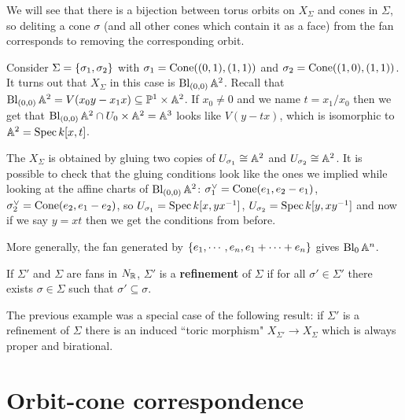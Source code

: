 \begin{remark}
We will see that there is a bijection between torus orbits on $X_\Sigma$ and cones in $\Sigma$, so deliting a cone $\sigma$ (and all other cones which contain it as a face) from the fan corresponds to removing the corresponding orbit.
\end{remark}


\begin{example}
Consider $\Sigma=\left\{{\sigma_1,\sigma_2}\right\}$ with $\sigma_1=\operatorname{Cone}((0,1),(1,1))$ and $\sigma_2=\operatorname{Cone}((1,0),(1,1))$. It turns out that $X_\Sigma$ in this case is $\operatorname{Bl}_{(0,0)}\mathbb{A}^2$. Recall that $\operatorname{Bl}_{(0,0)}\mathbb{A}^2=V(x_0y-x_1x)\subseteq \mathbb{P}^1\times\mathbb{A}^2$. If $x_0\neq 0$ and we name $t=x_1/x_0$ then we get that $\operatorname{Bl}_{(0,0)}\mathbb{A}^2\cap U_0\times \mathbb{A}^2=\mathbb{A}^3$ looks like $V(y-tx)$, which is isomorphic to $\mathbb{A}^2=\operatorname{Spec} k[x,t]$.

The $X_\Sigma$ is obtained by gluing two copies of $U_{\sigma_1}\cong \mathbb{A}^2$ and $U_{\sigma_2}\cong \mathbb{A}^2$. It is possible to check that the gluing conditions look like the ones we implied while looking at the affine charts of $\operatorname{Bl}_{(0,0)}\mathbb{A}^2$:
$\sigma_1^\vee=\operatorname{Cone}(e_1,e_2-e_1)$, $\sigma_2^\vee=\operatorname{Cone}(e_2,e_1-e_2)$, so $U_{\sigma_1}=\operatorname{Spec} k[x,y x^{-1}]$, $U_{\sigma_2}=\operatorname{Spec} k[y,xy^{-1}]$ and now if we say $y=xt$ then we get the conditions from before.
\end{example}

\begin{remark}
More generally, the fan generated by $\left\{{e_1,\cdots, e_n,e_1+\cdots+e_n}\right\}$ gives $\operatorname{Bl}_0\mathbb{A}^n$.
\end{remark}

\begin{definition}[]
If $\Sigma'$ and $\Sigma$ are fans in $N_{\mathbb{R}}$, $\Sigma'$ is a \textbf{refinement} of $\Sigma$ if for all $\sigma'\in \Sigma'$ there exists $\sigma\in \Sigma$ such that $\sigma'\subseteq \sigma$.
\end{definition}

\begin{remark}
The previous example was a special case of the following result: if $\Sigma'$ is a refinement of $\Sigma$ there is an induced ``toric morphism" $X_{\Sigma'}\to X_\Sigma$ which is always proper and birational.
\end{remark}


\section{Orbit-cone correspondence}

